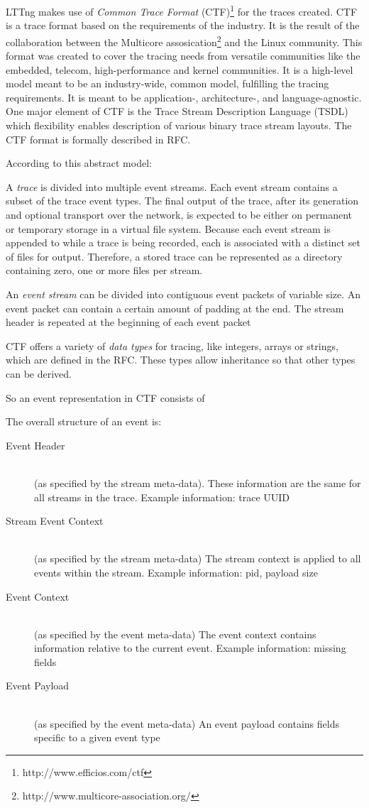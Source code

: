 LTTng makes use of \textit{Common Trace Format}
(CTF)\footnote{http://www.efficios.com/ctf} for the traces created. CTF is a
trace format based on the requirements of the industry. It is the result of the
collaboration between the Multicore
assosication\footnote{http://www.multicore-association.org/} and the Linux
community. This format was created to cover the tracing needs from versatile
communities like the embedded, telecom, high-performance and kernel communities.
It is a  high-level model meant to be an industry-wide, common model, fulfilling
the tracing requirements. It is meant to be application-, architecture-, and
language-agnostic. One major element of CTF is the Trace Stream Description
Language (TSDL) which flexibility enables description of various binary trace
stream layouts. The CTF format is formally described in RFC.

According to this abstract model:

A \textit{trace} is divided into multiple event streams. Each event stream
contains a subset of the trace event types. The final output of the trace, after
its generation and optional transport over the network, is expected to be either
on permanent or temporary storage in a virtual file system. Because each event
stream is appended to while a trace is being recorded, each is associated with a
distinct set of files for output. Therefore, a stored trace can be represented
as a directory containing zero, one or more files per stream.

An \textit{event stream} can be divided into contiguous event packets of
variable size. An event packet can contain a certain amount of padding at the
end. The stream header is repeated at the beginning of each event packet

CTF offers a variety of \textit{data types} for tracing, like integers, arrays
or strings, which are defined in the RFC. Τhese types allow inheritance so
that other types can be derived. 

So an event representation in CTF consists of 

The overall structure of an event is:

\begin{description}
\item[Event Header] \hfill \\
(as specified by the stream meta-data). These information are the same for all
streams in the trace. Example information: trace UUID
\item[Stream Event Context] \hfill \\ 
(as specified by the stream meta-data) The stream context is applied to all
events within the stream. Example information: pid, payload size
\item[Event Context] \hfill \\
(as specified by the event meta-data) The event context contains information
relative to the current event. Example information: missing fields
\item[Event Payload] \hfill \\
(as specified by the event meta-data) An event payload contains fields specific
to a given event type
\end{description}

